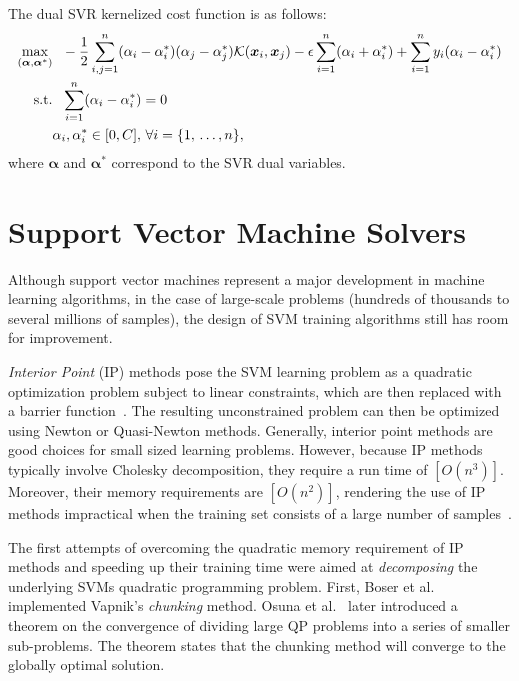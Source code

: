 \documentclass[reqno]{vcuthesis}
\newcommand{\set}[1]{{\left\{#1\right\}}}
\numberwithin{equation}{chapter}
\begin{document}
The dual SVR kernelized cost function is as follows:
\begin{equation}
\label{eq:dualSVR}
\centering
\begin{aligned}
\max\limits_{(\bm \alpha, \bm \alpha^*)} & {\,\,\,\,} -\frac{1}{2} \sum_{i,j = 1}^n (\alpha_i - \alpha^*_i)(\alpha_j - \alpha^*_j)\mathcal{K}(\bm x_i, \bm x_j)  - \epsilon \sum_{i=1}^n (\alpha_i + \alpha^*_i) + \sum_{i=1}^n y_i (\alpha_i - \alpha^*_i) \\
 \text{s.t.} & {\,\,\,\,} \sum_{i=1}^n (\alpha_i - \alpha^*_i) = 0 \\
 & \alpha_i, \alpha^*_i \in [0, C],\, \forall i = \set{1,\,\ldots,n},
 \end{aligned}
\end{equation}
where $\bm \alpha$ and $\bm \alpha^*$ correspond to the SVR dual variables.  

\section{Support Vector Machine Solvers}
Although support vector machines represent a major development in machine learning algorithms, in the case of large-scale problems (hundreds of thousands to several millions of samples), the design of SVM training algorithms still has room for improvement. 


\textit{Interior Point} (IP) methods pose the SVM learning problem as a quadratic optimization problem subject to linear constraints, which are then replaced with a barrier function~\cite{Boyd2004}. The resulting unconstrained problem can then be optimized using Newton or Quasi-Newton methods. Generally, interior point methods are good choices for small sized learning problems. However, because IP methods typically involve Cholesky decomposition, they require a run time of $[O(n^3)]$. Moreover, their memory requirements are $[O(n^2)]$, rendering the use of IP methods impractical when the training set consists of a large number of samples~\cite{shawe2011review}. 

The first attempts of overcoming the quadratic memory requirement of IP methods and speeding up their training time were aimed at \textit{decomposing} the underlying SVMs quadratic programming problem. First, Boser et al.~\cite{boser1992training} implemented Vapnik's \textit{chunking} method. Osuna et al.~\cite{osuna1997improved} later introduced a theorem on the convergence of dividing large QP problems into a series of smaller sub-problems. The theorem states that the chunking method will converge to the globally optimal solution. 
\end{document}
